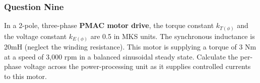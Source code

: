 \documentclass[a4paper,11pt]{article}
\begin{document}
\subsubsection*{Question Nine}
In a 2-pole, three-phase \textbf{PMAC motor drive}, the torque constant $k_{T(\phi)}$ and the voltage constant $k_{E(\phi)}$ are 0.5 in MKS units. The synchronous inductance is 20mH (neglect the winding resistance). This motor is supplying a torque of 3 Nm at a speed of 3,000 rpm in a balanced sinusoidal steady state. Calculate the per-phase voltage across the power-processing unit as it supplies controlled currents to this motor.
\end{document}
